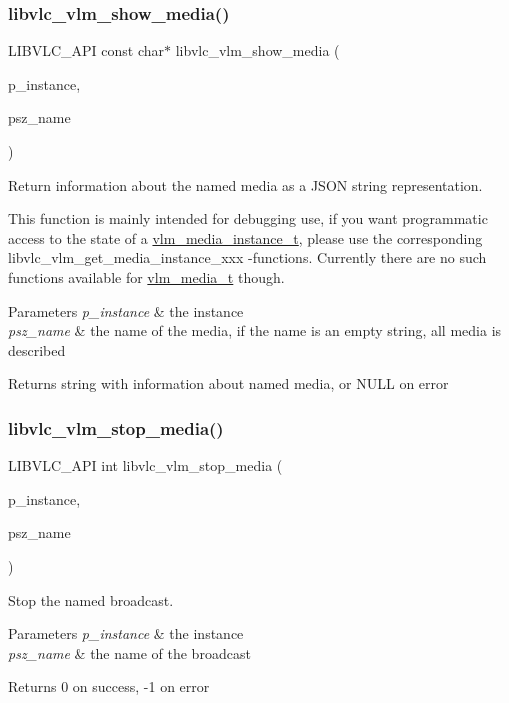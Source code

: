 \subsubsection{\texorpdfstring{libvlc\+\_\+vlm\+\_\+show\+\_\+media()}{libvlc\_vlm\_show\_media()}}
{\footnotesize\ttfamily L\+I\+B\+V\+L\+C\+\_\+\+A\+PI const char$\ast$ libvlc\+\_\+vlm\+\_\+show\+\_\+media (\begin{DoxyParamCaption}\item[{\hyperlink{group__libvlc__core_ga316d739a80da4678206c79f4d6c2e284}{libvlc\+\_\+instance\+\_\+t} $\ast$}]{p\+\_\+instance,  }\item[{const char $\ast$}]{psz\+\_\+name }\end{DoxyParamCaption})}

Return information about the named media as a J\+S\+ON string representation.

This function is mainly intended for debugging use, if you want programmatic access to the state of a \hyperlink{structvlm__media__instance__t}{vlm\+\_\+media\+\_\+instance\+\_\+t}, please use the corresponding libvlc\+\_\+vlm\+\_\+get\+\_\+media\+\_\+instance\+\_\+xxx -\/functions. Currently there are no such functions available for \hyperlink{structvlm__media__t}{vlm\+\_\+media\+\_\+t} though.


\begin{DoxyParams}{Parameters}
{\em p\+\_\+instance} & the instance \\
\hline
{\em psz\+\_\+name} & the name of the media, if the name is an empty string, all media is described \\
\hline
\end{DoxyParams}
\begin{DoxyReturn}{Returns}
string with information about named media, or N\+U\+LL on error 
\end{DoxyReturn}
\mbox{\label{group__libvlc__vlm_gad1ad823e28542b8e76c4454312cc3566}} 
\subsubsection{\texorpdfstring{libvlc\+\_\+vlm\+\_\+stop\+\_\+media()}{libvlc\_vlm\_stop\_media()}}
{\footnotesize\ttfamily L\+I\+B\+V\+L\+C\+\_\+\+A\+PI int libvlc\+\_\+vlm\+\_\+stop\+\_\+media (\begin{DoxyParamCaption}\item[{\hyperlink{group__libvlc__core_ga316d739a80da4678206c79f4d6c2e284}{libvlc\+\_\+instance\+\_\+t} $\ast$}]{p\+\_\+instance,  }\item[{const char $\ast$}]{psz\+\_\+name }\end{DoxyParamCaption})}

Stop the named broadcast.


\begin{DoxyParams}{Parameters}
{\em p\+\_\+instance} & the instance \\
\hline
{\em psz\+\_\+name} & the name of the broadcast \\
\hline
\end{DoxyParams}
\begin{DoxyReturn}{Returns}
0 on success, -\/1 on error 
\end{DoxyReturn}
